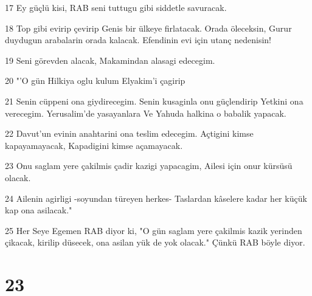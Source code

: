 \par 17 Ey güçlü kisi, RAB seni tuttugu gibi siddetle savuracak.
\par 18 Top gibi evirip çevirip Genis bir ülkeye firlatacak. Orada öleceksin, Gurur duydugun arabalarin orada kalacak. Efendinin evi için utanç nedenisin!
\par 19 Seni görevden alacak, Makamindan alasagi edecegim.
\par 20 "'O gün Hilkiya oglu kulum Elyakim'i çagirip
\par 21 Senin cüppeni ona giydirecegim. Senin kusaginla onu güçlendirip Yetkini ona verecegim. Yerusalim'de yasayanlara Ve Yahuda halkina o babalik yapacak.
\par 22 Davut'un evinin anahtarini ona teslim edecegim. Açtigini kimse kapayamayacak, Kapadigini kimse açamayacak.
\par 23 Onu saglam yere çakilmis çadir kazigi yapacagim, Ailesi için onur kürsüsü olacak.
\par 24 Ailenin agirligi -soyundan türeyen herkes- Taslardan kâselere kadar her küçük kap ona asilacak."
\par 25 Her Seye Egemen RAB diyor ki, "O gün saglam yere çakilmis kazik yerinden çikacak, kirilip düsecek, ona asilan yük de yok olacak." Çünkü RAB böyle diyor.

\chapter{23}

